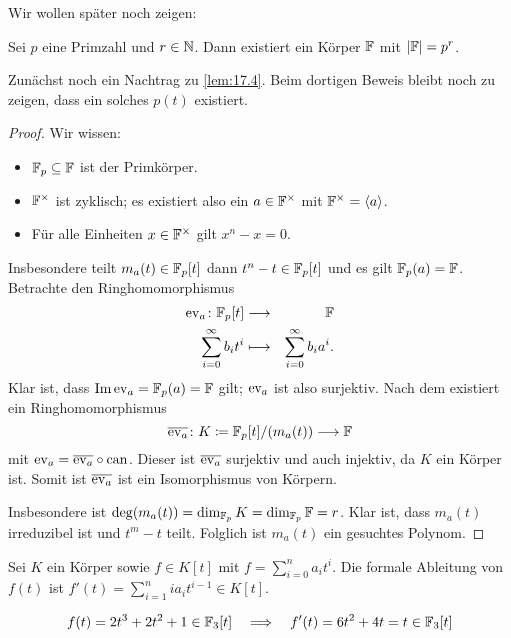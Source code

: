 \documentclass[12pt,a4paper]{scrartcl}
\begin{document}

Wir wollen später noch zeigen:
\begin{satz}\label{thm:18.1}
	Sei $p$ eine Primzahl und $r\in\mathbb N$. Dann existiert ein Körper $\mathbb F$ mit $|\mathbb F| = p^r$.
\end{satz}

\medskip

Zunächst noch ein {Nachtrag\label{nachtrag zu 17.4}} zu \cref{lem:17.4}. Beim dortigen Beweis bleibt noch zu zeigen, dass ein solches $p(t)$ existiert.
\begin{proof}
	Wir wissen:
	\begin{itemize}
		\item $\mathbb F_p\subseteq \mathbb F$ ist der Primkörper.
		\item $\mathbb F^{\times}$ ist zyklisch; es existiert also ein $a\in\mathbb F^{\times}$ mit $\mathbb F^{\times} = \langle a\rangle$.
		\item Für alle Einheiten $x\in \mathbb F^{\times}$ gilt $x^n-x = 0$.
	\end{itemize}
	Insbesondere teilt $m_a(t)\in\mathbb F_p[t]$ dann $t^n-t\in\mathbb F_p[t]$ und es gilt $\mathbb F_p(a) = \mathbb F$. Betrachte den Ringhomomorphismus
	\begin{eqnarray*}
		\operatorname{ev}_a\colon \mathbb F_p[t] & \longrightarrow & \mathbb F\\
		\sum_{i = 0}^{\infty} b_it^i & \longmapsto &\sum_{i = 0}^{\infty}b_ia^i.
	\end{eqnarray*}
	Klar ist, dass $\operatorname{Im}\operatorname{ev}_a = \mathbb F_p(a) = \mathbb F$ gilt; $\operatorname{ev}_a$ ist also surjektiv. Nach dem  existiert ein Ringhomomorphismus
	\[\overline{\operatorname{ev}_a}\colon K \coloneqq \mathbb F_p[t]/(m_a(t))\longrightarrow \mathbb F\]
	mit $\operatorname{ev}_a = \overline{\operatorname{ev}_a}\circ\operatorname{can}$. Dieser ist $\overline{\operatorname{ev}_a}$ surjektiv und auch injektiv, da $K$ ein Körper ist. Somit ist $\overline{\operatorname{ev}_a}$ ist ein Isomorphismus von Körpern.
	
	Insbesondere ist $\deg(m_a(t)) = \dim_{\mathbb F_p}K = \dim_{\mathbb F_p}\mathbb F= r$. Klar ist, dass $m_a(t)$ irreduzibel ist und $t^m-t$ teilt. Folglich ist $m_a(t)$ ein gesuchtes Polynom.
\end{proof}

\begin{defi}
	Sei $K$ ein Körper sowie $f\in K[t]$ mit $f = \sum_{i = 0}^n a_it^i$. Die formale Ableitung von $f(t)$ ist $f'(t) = \sum_{i = 1}^{n} ia_it^{i-1}\in K[t]$.
\end{defi}
\begin{bsp}
	\[
	f(t) = 2t^3+2t^2+1\in \mathbb F_3[t] \quad \Longrightarrow \quad f'(t) = 6t^2 + 4t = t\in\mathbb F_3[t]
	\]
\end{bsp}
\end{document}
